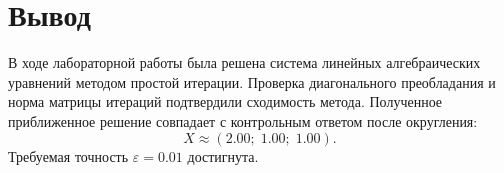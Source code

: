 \documentclass[12pt,a4paper]{article}
\begin{document}
\section{Вывод}

В ходе лабораторной работы была решена система линейных алгебраических уравнений методом простой итерации. Проверка диагонального преобладания и норма матрицы итераций подтвердили сходимость метода. Полученное приближенное решение совпадает с контрольным ответом после округления:
\[
X \approx (2.00;\;1.00;\;1.00).
\]
Требуемая точность \(\varepsilon = 0.01\) достигнута.
\end{document}
